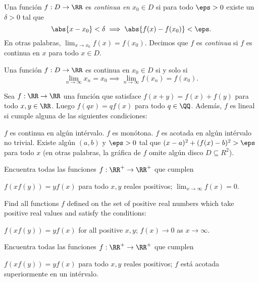 
\begin{definition}[Continuidad]
	Una función $f:D\to\RR$ es \emph{continua en} $x_0\in D$ si para todo $\eps>0$ existe un $\delta>0$ tal que
	\[\abs{x-x_0}<\delta\implies\abs{f(x)-f(x_0)}<\eps.\]
	En otras palabras, $\displaystyle\lim_{x\to x_0}f(x)=f(x_0)$. Decimos que $f$ es \emph{continua} si $f$ es continua en $x$ para todo $x\in D$.
\end{definition}

\begin{proposition}
	Una función $f:D\to\RR$ es continua en $x_0\in D$ si y solo si
	\[\lim_{n\to\infty}x_n=x_0\implies\lim_{n\to\infty}f(x_n)=f(x_0).\]
\end{proposition}

\begin{theorem}
	Sea $f:\RR\to\RR$ una función que satisface $f(x+y)=f(x)+f(y)$ para todo $x,y\in\RR$. Luego $f(qx)=qf(x)$ para todo $q\in\QQ$. Además, $f$ es lineal si cumple alguna de las siguientes condiciones:
	\begin{itemize}
		\ii $f$ es continua en algún intérvalo.
		\ii $f$ es monótona.
		\ii $f$ es acotada en algún intérvalo no trivial.
		\ii Existe algún $(a,b)$ y $\eps>0$ tal que $(x-a)^2+(f(x)-b)^2>\eps$ para todo $x$ (en otras palabras, la gráfica de $f$ omite algún disco $D\subseteq R^2$).
	\end{itemize}
\end{theorem}

\begin{problem}[IMO 1983/1]
	Encuentra todas las funciones $f:\RR^+\to\RR^+$ que cumplen
	\begin{enumerate}[(i)]
		\ii $f(xf(y))=yf(x)$ para todo $x,y$ reales positivos;
		\ii $\displaystyle\lim_{x\to\infty}f(x)=0$.
	\end{enumerate}
	\begin{hint}
		Find all functions $f$ defined on the set of positive real numbers which take positive real values and satisfy the conditions:
		\begin{enumerate}[(i)]
			\ii $f(xf(y))=yf(x)$ for all positive $x,y$;
			\ii $f(x)\to 0$ as $x\to\infty$.
		\end{enumerate}
	\end{hint}
\end{problem}

\begin{problem}
	Encuentra todas las funciones $f:\RR^+\to\RR^+$ que cumplen
	\begin{enumerate}[(i)]
		\ii $f(xf(y))=yf(x)$ para todo $x,y$ reales positivos;
		\ii $f$ está acotada superiormente en un intérvalo.
	\end{enumerate}
\end{problem}


